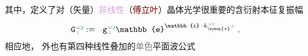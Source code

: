 其中，定义了对（矢量）\textcolor{Plum}{非线性}（\textcolor{Maroon}{傅立叶}）\textcolor{PineGreen}{晶体光学}很重要的\textcolor{NavyBlue}{含衍射}\textcolor{PineGreen}{本征复振幅}
\begin{align} \label{eq:amp_phase}
	\xint{\mathcolor{gray}{-}}{20}{\mathtt{G}}^{\;\!\mathcolor{gray}{\omega} \textcolor{PineGreen}{\jmath}}_{\;\! \mathcolor{gray}{z}} &:= \xint{\begin{smallmatrix} ~ \\ {}^{}_{\mathcolor{gray}{-}} \\ ~ \end{smallmatrix}}{09}{\mathtt{g}}^{\;\!\mathcolor{gray}{\omega} \textcolor{PineGreen}{\jmath}}_{\;\! \mathcolor{gray}{z}} \mathbb{e}^{\mathbb{i} \xint{\begin{smallmatrix} ~ \\ {}^{}_{\mathcolor{gray}{-}} \\ ~ \end{smallmatrix}}{15}{k}_{\symup{z}}^{\;\! \mathcolor{gray}{\omega} \textcolor{PineGreen}{\jmath}} \mathcolor{gray}{z}} ~, 
\end{align}
相应地， 外也有第四种\textcolor{PineGreen}{线性叠加的\textcolor{gray}{单色}平面波}公式
